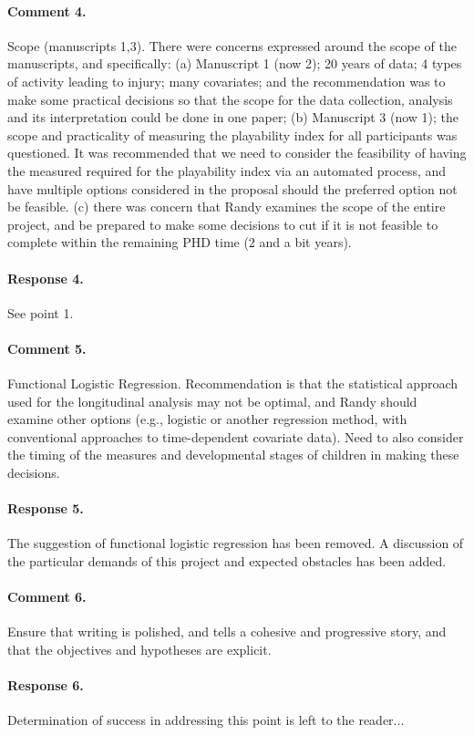 \documentclass [11pt]{article}
\begin{document}
\paragraph{Comment 4.}Scope (manuscripts 1,3).  There were concerns expressed around the scope of the manuscripts, and specifically: (a) Manuscript 1 (now 2);  20 years of data; 4 types of activity leading to injury; many covariates; and the recommendation was to make some practical decisions so that the scope for the data collection, analysis and its interpretation could be done in one paper;  (b) Manuscript 3 (now 1);  the scope and practicality of measuring the playability index for all participants was questioned.  It was recommended that we need to consider the feasibility of having the measured required for the playability index via an automated process, and have multiple options considered in the proposal should the preferred option not be feasible.  (c) there was concern that Randy examines the scope of the entire project, and be prepared to make some decisions to cut if it is not feasible to complete within the remaining PHD time (2 and a bit years).

\paragraph{Response 4.}See point 1.

\paragraph{Comment 5.}Functional Logistic Regression.  Recommendation is that the statistical approach used for the longitudinal analysis may not be optimal, and Randy should examine other options (e.g., logistic or another regression method, with conventional approaches to time-dependent covariate data).  Need to also consider the timing of the measures and developmental stages of children in making these decisions.

\paragraph{Response 5.}The suggestion of functional logistic regression has been removed. A discussion of the particular demands of this project and expected obstacles has been added.

\paragraph{Comment 6.}Ensure that writing is polished, and tells a cohesive and progressive story, and that the objectives and hypotheses are explicit.

\paragraph{Response 6.} Determination of success in addressing this point is left to the reader...  
\end{document}
